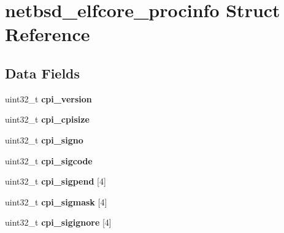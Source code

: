 \hypertarget{structnetbsd__elfcore__procinfo}{}\section{netbsd\+\_\+elfcore\+\_\+procinfo Struct Reference}
\label{structnetbsd__elfcore__procinfo}
\subsection*{Data Fields}
\begin{DoxyCompactItemize}
\item 
\mbox{\label{structnetbsd__elfcore__procinfo_a5679e5439031c05f80c0d1366dd42b3a}} 
uint32\+\_\+t {\bfseries cpi\+\_\+version}
\item 
\mbox{\label{structnetbsd__elfcore__procinfo_a535a885808b06081c67bdc9921170aa3}} 
uint32\+\_\+t {\bfseries cpi\+\_\+cpisize}
\item 
\mbox{\label{structnetbsd__elfcore__procinfo_a46295a09063aa15bc4810ef8752bf7de}} 
uint32\+\_\+t {\bfseries cpi\+\_\+signo}
\item 
\mbox{\label{structnetbsd__elfcore__procinfo_a87c182d6d08e6f2eb439f01519331e55}} 
uint32\+\_\+t {\bfseries cpi\+\_\+sigcode}
\item 
\mbox{\label{structnetbsd__elfcore__procinfo_abe6a1cda28b10fb4a1d559b7e03b5e81}} 
uint32\+\_\+t {\bfseries cpi\+\_\+sigpend} \mbox{[}4\mbox{]}
\item 
\mbox{\label{structnetbsd__elfcore__procinfo_a167fd2532be7b063d2e71ffd7d2bd4a4}} 
uint32\+\_\+t {\bfseries cpi\+\_\+sigmask} \mbox{[}4\mbox{]}
\item 
\mbox{\label{structnetbsd__elfcore__procinfo_a68025e7a0bfec88ebdc00f945f639473}} 
uint32\+\_\+t {\bfseries cpi\+\_\+sigignore} \mbox{[}4\mbox{]}
\item 
\mbox{\label{structnetbsd__elfcore__procinfo_a5fe5a449f81aedc0822c33c5abb47f56}} 

\end{DoxyCompactItemize}
